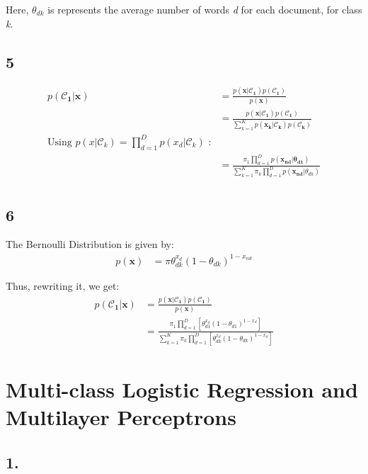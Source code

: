 \documentclass[a4paper]{article}
\begin{document}
Here, $\theta_{dk}$ is represents the average number of words \textit{d} for each document, for class \textit{k}.



\subsection*{5}

\begin{align*}
    p(\pmb{\mathcal{C}_{1}} | \pmb{x}) &= \frac{p(\pmb{x}|\pmb{\mathcal{C}_1})p(\pmb{\mathcal{C}_1})}{p(\pmb{x})} \\
    &= \frac{p(\pmb{x}|\pmb{\mathcal{C}_1})p(\pmb{\mathcal{C}_1})}
    {\sum_{k=1}^{K} p(\pmb{x_{k}}|\pmb{\mathcal{C}_k})p(\pmb{\mathcal{C}_k})} \\
    \text{Using \ } p(x|\mathcal{C}_{k}) = \prod_{d=1}^{D} p(x_{d}|\mathcal{C}_{k}) \text{ \ :}\\
    &= \frac{\pi_{1}\prod_{d=1}^{D}p(\pmb{x_{nd}}|\pmb{\theta_{d1}})}
    {\sum_{k=1}^{K} \pi_{k} \prod_{d=1}^{D} p(\pmb{x_{nd}}|\theta_{dk})} \\
\end{align*}{}

\subsection*{6}
The Bernoulli Distribution is given by:
\begin{align*}
    p(\pmb{x}) &= \pi \theta_{dk}^{x_{d}}(1-\theta_{dk})^{1-x_{nd}}
\end{align*}{}

Thus, rewriting it, we get:
\begin{align*}
    p(\pmb{\mathcal{C}_{1}} | \pmb{x}) &= \frac{p(\pmb{x}|\pmb{\mathcal{C}_1})p(\pmb{\mathcal{C}_1})}{p(\pmb{x})} \\
    &= \frac{\pi_{1}\prod_{d=1}^{D} \left[\theta_{d1}^{x_{d}}(1 - \theta_{d1})^{1-x_{d}} \right]}
    {\sum_{k=1}^{K} \pi_{k}\prod_{d=1}^{D} \left[\theta_{dk}^{x_{d}}(1 - \theta_{dk})^{1-x_{d}} \right]}
\end{align*}{}
\bigskip

\section*{Multi-class Logistic Regression and Multilayer Perceptrons}

\subsection*{1.}
\end{document}

